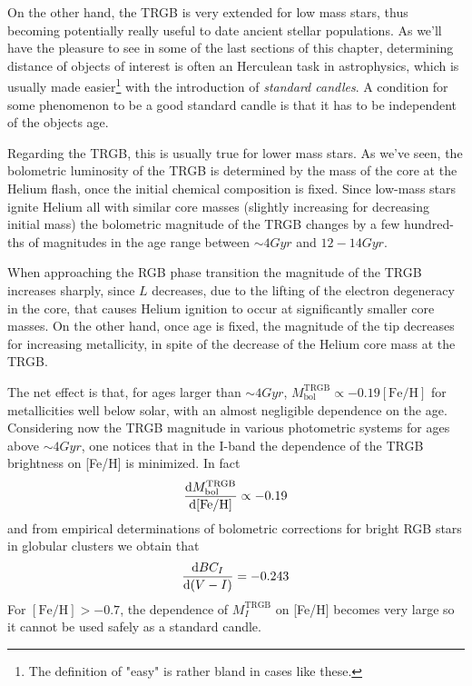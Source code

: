 \par On the other hand, the TRGB is very extended for low mass stars, thus becoming potentially really useful to date ancient stellar populations. As we'll have the pleasure to see in some of the last sections of this chapter, determining distance of objects of interest is often an Herculean task in astrophysics, which is usually made easier\footnote{The definition of "easy" is rather bland in cases like these.} with the introduction of \emph{standard candles}. A condition for some phenomenon to be a good standard candle is that it has to be independent of the objects age.
\par Regarding the TRGB, this is usually true for lower mass stars. As we've seen, the bolometric luminosity of the TRGB is determined by the mass of the core at the Helium flash, once the initial chemical composition is fixed. Since
low-mass stars ignite Helium all with similar core masses (slightly increasing for decreasing initial mass) the bolometric magnitude of the TRGB changes by a few hundred-ths of magnitudes in the age range between $\sim 4\unit{Gyr}$ and $12-14\unit{Gyr}$.
\par When approaching the RGB phase transition the magnitude of the TRGB increases sharply, since $L$ decreases, due to the lifting of the electron degeneracy in the core, that causes Helium ignition to occur at significantly smaller core masses. On the other hand, once age is fixed, the magnitude of the tip decreases for increasing metallicity, in spite of the decrease of the Helium core mass at the TRGB.
\par The net effect is that, for ages larger than $\sim 4 \unit{Gyr}$, $M_{\text{bol}}^{\text{TRGB}} \propto -0.19 [\text{Fe}/\text{H}]$ for metallicities well below solar, with an almost negligible dependence on the age. Considering now the TRGB magnitude in various photometric systems for ages
above $\sim 4\unit{Gyr}$, one notices that in the I-band the dependence of the TRGB brightness on [Fe/H] is minimized. In fact
\begin{equation*}
    \frac{\text{d}M_{\text{bol}}^{\text{TRGB}}}{\text{d}[\text{Fe}/\text{H}]} \propto -0.19
\end{equation*}
and from empirical determinations of bolometric corrections for bright RGB stars in globular clusters we obtain that
\begin{equation*}
    \frac{\text{d}BC_{I}}{\text{d}(V-I)} = -0.243
\end{equation*}
For $[\text{Fe}/\text{H}] >-0.7$, the dependence of $M_{I}^{\text{TRGB}}$ on [Fe/H] becomes very large so it cannot be used safely as a standard candle.
